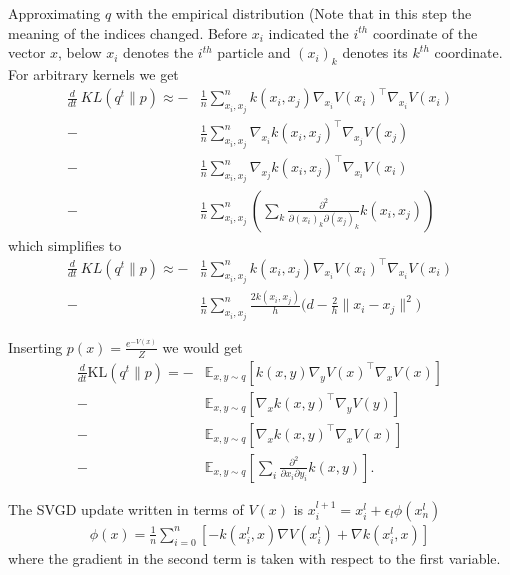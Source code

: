 \documentclass{article}
\begin{document}
    Approximating $q$ with the empirical distribution
    (Note that in this step the meaning of the indices changed. Before $x_i$ indicated the $i^{th}$
    coordinate of the vector $x$, below $x_i$ denotes the $i^{th}$ particle and $(x_i)_k$ denotes
    its $k^{th}$ coordinate.
    For arbitrary kernels we get
    \begin{align}
        \frac{d}{dt}\ KL( q^t \| p ) \approx -& \frac{1}{n}\sum_{x_i,x_j}^n  k(x_i,x_j) \nabla_{x_i} V(x_i)^\top \nabla_{x_i} V(x_i)  \\ 
        -& \frac{1}{n}\sum_{x_i,x_j}^n  \nabla_{x_i} k(x_i,x_j)^\top \nabla_{x_j} V(x_j)  \\ 
        -& \frac{1}{n}\sum_{x_i,x_j}^n  \nabla_{x_j} k(x_i,x_j)^\top \nabla_{x_i} V(x_i)  \\ 
        -& \frac{1}{n}\sum_{x_i,x_j}^n \left( \sum_k \frac{ \partial^2 }{ \partial (x_i)_k \partial (x_j)_k } 
            k(x_i,x_j) \right)
    \end{align}
    which simplifies to 
    \begin{align}
        \frac{d}{dt}\ KL( q^t \| p ) \approx -& \frac{1}{n}\sum_{x_i,x_j}^n  k(x_i,x_j) \nabla_{x_i} V(x_i)^\top \nabla_{x_i} V(x_i)  \\ 
        -& \frac{1}{n}\sum_{x_i,x_j}^n \frac{2k(x_i, x_j)}{h}\Big( d - \frac{2}{h} \|x_i - x_j\|^2 \Big)
    \end{align} 

    Inserting $p(x) = \frac{e^{-V(x)}}{Z}$ we would get
    \begin{align}
        \frac{d}{dt} \text{KL}( q^t \| p ) =
        -& \mathbb{E}_{x,y\sim q} \left[ k(x,y) \nabla_y V(x)^\top \nabla_x V(x) \right] \\ 
        -& \mathbb{E}_{x,y\sim q} \left[ \nabla_x k(x,y)^\top \nabla_y V(y) \right] \\ 
        -& \mathbb{E}_{x,y\sim q} \left[ \nabla_x k(x,y)^\top \nabla_x V(x) \right] \\ 
        -& \mathbb{E}_{x,y\sim q} \left[ \sum_i \frac{ \partial^2 }{ \partial x_i \partial y_i } k(x,y) \right]
        .
    \end{align}

    The SVGD update written in terms of $V(x)$ is $x_i^{l+1} = x_i^l + \epsilon_l \phi(x_n^l)$
    \begin{align}
        \phi(x) = \frac{1}{n} \sum_{i=0}^{n} \left[
            - k(x_i^l, x) \nabla V(x_i^l) + \nabla k(x_i^l, x)
        \right]
    \end{align}
    where the gradient in the second term is taken with respect to the first variable.
    
\end{document}
